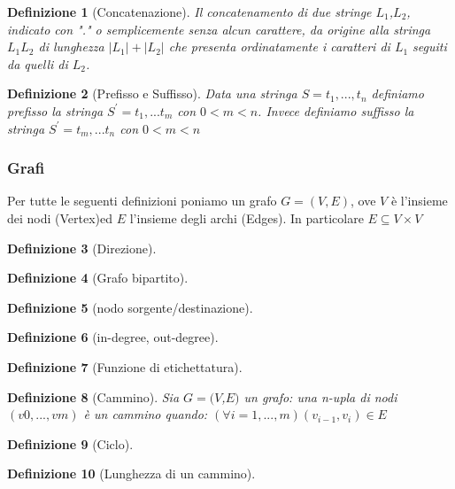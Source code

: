 \documentclass[a4paper]{article}
\newtheorem*{definition}{Definizione}
\begin{document}
\begin{definition}[Concatenazione] Il concatenamento di due stringe $L_1$,$L_2$, indicato con "." o semplicemente senza alcun carattere, da origine alla stringa $L_1L_2$ di lunghezza $|L_1| + |L_2|$ che presenta ordinatamente i caratteri di $L_1$ seguiti da quelli di $L_2$.
\end{definition}

\begin{definition}[Prefisso e Suffisso]Data una stringa $S = t_1,...,t_n$ definiamo prefisso la stringa $S^' = t_1,...t_m$ con $ 0 < m < n$. Invece definiamo suffisso la stringa $S^' = t_m,...t_n$ con $ 0 < m < n$ 
\end{definition}


\subsubsection{Grafi}

Per tutte le seguenti definizioni poniamo un grafo $G =(V, E)$, ove $V$ è l'insieme dei nodi (Vertex)ed $E$ l'insieme degli archi (Edges). In particolare $E \subseteq V\times V$  
\begin{definition}[Direzione]
\end{definition}

\begin{definition}[Grafo bipartito]
\end{definition}

\begin{definition}[nodo sorgente/destinazione]
\end{definition}

\begin{definition}[in-degree, out-degree]
\end{definition}

\begin{definition}[Funzione di etichettatura]
\end{definition}

\begin{definition}[Cammino]Sia $G = (V$,$ E)$ un grafo: una n-upla di nodi $(v0, ..., vm)$ è un cammino quando: $(\forall i=1,...,m)(v_{i-1},v_{i})\in E$
\end{definition}

\begin{definition}[Ciclo]
\end{definition}

\begin{definition}[Lunghezza di un cammino]
\end{definition}
\end{document}
